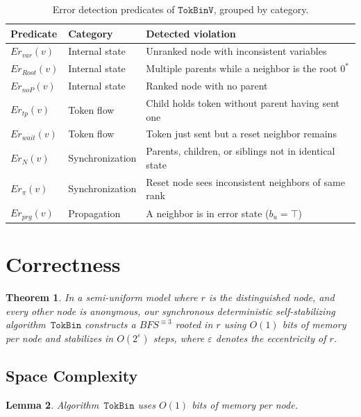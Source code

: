 \documentclass[a4paper, 12pt]{article}
\newtheorem{theorem}{Theorem}
\newtheorem{lemma}[theorem]{Lemma}
\begin{document}
\begin{table}[h]
\centering
\renewcommand{\arraystretch}{1.4}
\begin{tabular}{l l l}
\hline
\textbf{Predicate} & \textbf{Category} & \textbf{Detected violation} \\
\hline
$Er_{var}(v)$  & Internal state   & Unranked node with inconsistent variables \\
$Er_{Root}(v)$ & Internal state   & Multiple parents while a neighbor is the root $0^*$ \\
$Er_{noP}(v)$    & Internal state   & Ranked node with no parent \\
\hline
$Er_{tp}(v)$   & Token flow       & Child holds token without parent having sent one \\
$Er_{wait}(v)$ & Token flow       & Token just sent but a reset neighbor remains \\
\hline
$Er_N(v)$      & Synchronization  & Parents, children, or siblings not in identical state \\
$Er_\pi(v)$    & Synchronization  & Reset node sees inconsistent neighbors of same rank \\
\hline
$Er_{prg}(v)$  & Propagation      & A neighbor is in error state ($b_u = \top$) \\
\hline
\end{tabular}
\caption{Error detection predicates of $\mathtt{TokBinV}$, grouped by category.}
\label{tab:errors}
\end{table}



\section{Correctness}
\begin{theorem}
\label{thm:main}
In a semi-uniform model where $r$ is the distinguished node, and every 
other node is anonymous, our synchronous deterministic self-stabilizing 
algorithm~$\mathtt{TokBin}$ constructs a $BFS^{\equiv 3}$  rooted in $r$ using 
$O(1)$ bits of memory per node and stabilizes in $O(2^{\varepsilon})$ steps, where $\varepsilon$ 
denotes the eccentricity of $r$.
\end{theorem}

\subsection{Space Complexity}

\begin{lemma}
\label{lemma:space}
Algorithm~$\mathtt{TokBin}$ uses $O(1)$ bits of memory per 
node.
\end{lemma}
\end{document}
